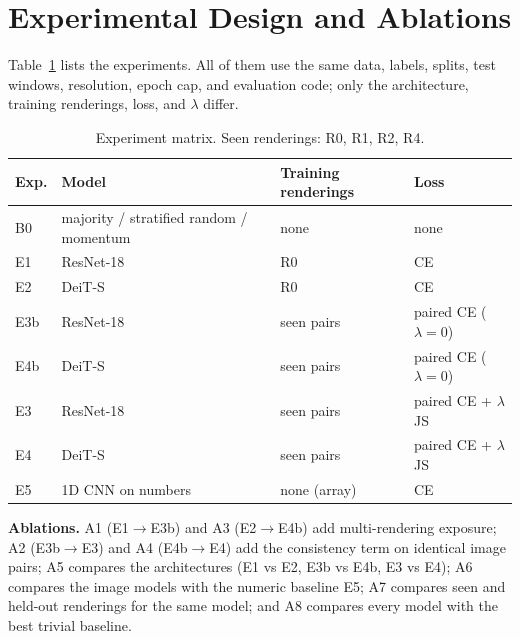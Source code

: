 \documentclass[10pt,journal,compsoc]{IEEEtran}
\begin{document}
\section{Experimental Design and Ablations}\label{sec:design}
Table~\ref{tab:design} lists the experiments. All of them use the same data, labels, splits, test windows, resolution, epoch cap, and evaluation code; only the architecture, training renderings, loss, and $\lambda$ differ.

\begin{table}[t]
\centering
\footnotesize
\caption{Experiment matrix. Seen renderings: R0, R1, R2, R4.}
\label{tab:design}
\begin{tabular}{@{}llll@{}}
\toprule
Exp. & Model & Training renderings & Loss \\
\midrule
B0 & majority / stratified random / momentum & none & none \\
E1 & ResNet-18 & R0 & CE \\
E2 & DeiT-S & R0 & CE \\
E3b & ResNet-18 & seen pairs & paired CE ($\lambda=0$) \\
E4b & DeiT-S & seen pairs & paired CE ($\lambda=0$) \\
E3 & ResNet-18 & seen pairs & paired CE + $\lambda$ JS \\
E4 & DeiT-S & seen pairs & paired CE + $\lambda$ JS \\
E5 & 1D CNN on numbers & none (array) & CE \\
\bottomrule
\end{tabular}
\end{table}

\textbf{Ablations.} A1 (E1$\to$E3b) and A3 (E2$\to$E4b) add multi-rendering exposure; A2 (E3b$\to$E3) and A4 (E4b$\to$E4) add the consistency term on identical image pairs; A5 compares the architectures (E1 vs E2, E3b vs E4b, E3 vs E4); A6 compares the image models with the numeric baseline E5; A7 compares seen and held-out renderings for the same model; and A8 compares every model with the best trivial baseline.
\end{document}
